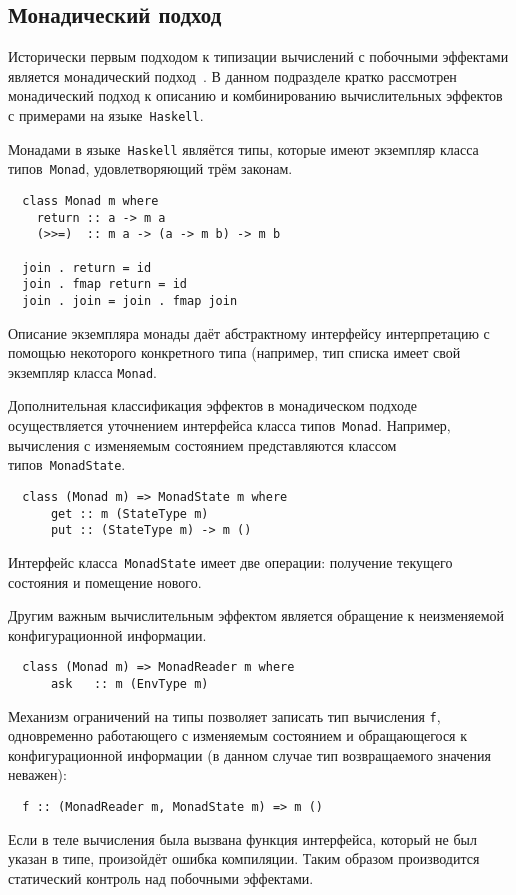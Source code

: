 \documentclass [a4paper] {article}
\begin{document}
\subsection{Монадический подход}

Исторически первым подходом к типизации вычислений с побочными эффектами
является монадический подход~\cite{Moggi:1989:CLM:77350.77353}. В данном подразделе
кратко рассмотрен монадический подход к описанию и комбинированию
вычислительных эффектов с примерами на языке~\texttt{Haskell}.

Монадами в языке~\texttt{Haskell} являётся типы, которые имеют экземпляр
класса типов~\texttt{Monad}, удовлетворяющий трём законам.
\begin{verbatim}
  class Monad m where
    return :: a -> m a
    (>>=)  :: m a -> (a -> m b) -> m b

  join . return = id
  join . fmap return = id
  join . join = join . fmap join
\end{verbatim}
Описание экземпляра монады даёт абстрактному интерфейсу
интерпретацию с помощью некоторого конкретного типа (например, тип списка имеет свой экземпляр класса \texttt{Monad}.

Дополнительная классификация эффектов в монадическом подходе осуществляется
уточнением интерфейса класса типов~\texttt{Monad}. Например, вычисления с
изменяемым состоянием представляются классом типов~\texttt{MonadState}.
\begin{verbatim}
  class (Monad m) => MonadState m where
      get :: m (StateType m)
      put :: (StateType m) -> m ()
\end{verbatim}
Интерфейс класса~\texttt{MonadState} имеет две операции: получение текущего состояния и помещение
нового.

Другим важным вычислительным эффектом является обращение к
неизменяемой конфигурационной информации.
\begin{verbatim}
  class (Monad m) => MonadReader m where
      ask   :: m (EnvType m)
\end{verbatim}

Механизм ограничений на типы позволяет записать тип вычисления \texttt{f}, одновременно работающего с изменяемым состоянием и обращающегося к конфигурационной информации (в данном случае тип возвращаемого значения неважен):
\begin{verbatim}
  f :: (MonadReader m, MonadState m) => m ()
\end{verbatim}
Если в теле вычисления была вызвана функция интерфейса,
который не был указан в типе, произойдёт ошибка компиляции.
Таким образом производится статический контроль над побочными
эффектами.
\end{document}
